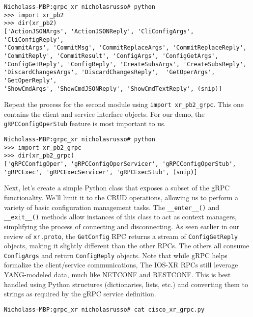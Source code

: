\begin{verbatim}
Nicholass-MBP:grpc_xr nicholasrusso# python
>>> import xr_pb2
>>> dir(xr_pb2)
['ActionJSONArgs', 'ActionJSONReply', 'CliConfigArgs', 'CliConfigReply',
'CommitArgs', 'CommitMsg', 'CommitReplaceArgs', 'CommitReplaceReply',
'CommitReply', 'CommitResult', 'ConfigArgs', 'ConfigGetArgs',
'ConfigGetReply', 'ConfigReply', 'CreateSubsArgs', 'CreateSubsReply',
'DiscardChangesArgs', 'DiscardChangesReply',  'GetOperArgs', 'GetOperReply',
'ShowCmdArgs', 'ShowCmdJSONReply', 'ShowCmdTextReply', (snip)]
\end{verbatim}

Repeat the process for the second module using \verb|import xr_pb2_grpc|.
This one contains the client and service interface objects. For our demo,
the \verb|gRPCConfigOperStub| feature is most important to us.

\begin{verbatim}
Nicholass-MBP:grpc_xr nicholasrusso# python
>>> import xr_pb2_grpc
>>> dir(xr_pb2_grpc)
['gRPCConfigOper', 'gRPCConfigOperServicer', 'gRPCConfigOperStub',
'gRPCExec', 'gRPCExecServicer', 'gRPCExecStub', (snip)]
\end{verbatim}

Next, let's create a simple Python class that exposes a subset of the
gRPC functionality. We'll limit it to the CRUD operations, allowing
us to perform a variety of basic configuration management tasks. The
\verb|__enter__()| and \verb|__exit__()| methods allow instances of this
class to act as context managers, simplifying the process of connecting
and disconnecting. As seen earlier in our review of \verb|xr.proto|,
the \verb|GetConfig| RPC returns a stream of \verb|ConfigGetReply|
objects, making it slightly different than the other RPCs. The others
all consume \verb|ConfigArgs| and return \verb|ConfigReply| objects.
Note that while gRPC helps formalize the client/service communications,
The IOS-XR RPCs still leverage YANG-modeled data, much like NETCONF and
RESTCONF\@. This is best handled using Python structures (dictionaries, lists,
etc.) and converting them to strings as required by the gRPC service definition.

\begin{verbatim}
Nicholass-MBP:grpc_xr nicholasrusso# cat cisco_xr_grpc.py
\end{verbatim}

